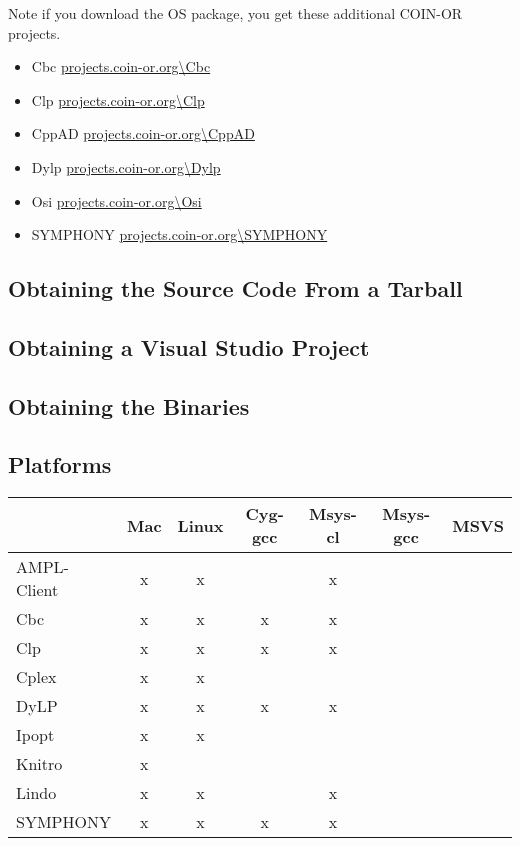 \documentclass[12pt]{article}
\renewcommand{\_}{{\char"5F}}
\renewcommand{\{}{{\char"7B}}
\renewcommand{\}}{{\char"7D}}
\renewcommand{\^}{{\char"0D}}
\renewcommand{\'}{{\char"0D}}
\begin{document}
 Note if you download the OS package, you get these additional COIN-OR projects.
\begin{itemize}
\item Cbc \url{projects.coin-or.org\Cbc}
\item Clp  \url{projects.coin-or.org\Clp}
\item CppAD \url{projects.coin-or.org\CppAD}
\item Dylp \url{projects.coin-or.org\Dylp}
\item Osi \url{projects.coin-or.org\Osi}
\item SYMPHONY \url{projects.coin-or.org\SYMPHONY}
\end{itemize}


\subsection{Obtaining the Source Code From a Tarball}

\subsection{Obtaining a Visual Studio Project}

\subsection{Obtaining the Binaries}


\subsection{Platforms}


 \begin{tabular}{l|c|c|c|c|c|c|}
 &Mac&Linux&Cyg-gcc&Msys-cl&Msys-gcc&MSVS \\ \hline
AMPL-Client &x&x&&x&& \\ \hline
Cbc &x&x&x&x&& \\ \hline
Clp &x&x&x&x&& \\ \hline
Cplex &x&x&&&& \\ \hline
DyLP &x&x&x&x&& \\ \hline
Ipopt &x&x&&&& \\ \hline
Knitro &x&&&&& \\ \hline
Lindo &x&x&&x&& \\ \hline
SYMPHONY &x&x&x&x&& \\ \hline
 \end{tabular}
 
 \vskip 14pt
 
\end{document}
